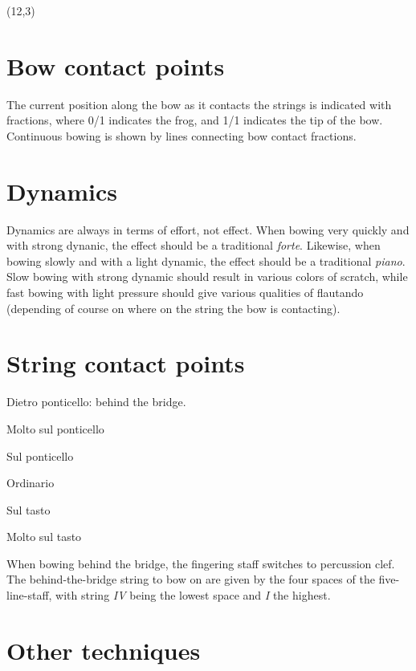 \documentclass[10pt]{article}
\begin{document}
\begin{textblock}{11}(12,3)

\section{Bow contact points}

The current position along the bow as it contacts the strings is indicated
with fractions, where 0/1 indicates the frog, and 1/1 indicates the tip of
the bow. Continuous bowing is shown by lines connecting bow contact
fractions.

\section{Dynamics}

Dynamics are always in terms of effort, not effect. When bowing very
quickly and with strong dynanic, the effect should be a traditional
\emph{forte}. Likewise, when bowing slowly and with a light dynamic, the
effect should be a traditional \emph{piano}. Slow bowing with strong
dynamic should result in various colors of scratch, while fast bowing with
light pressure should give various qualities of flautando (depending of
course on where on the string the bow is contacting).

\section{String contact points}

\begin{description}[style=nextline]
    \item[D.P.]
        Dietro ponticello: behind the bridge.
    \item[M.S.P.]
        Molto sul ponticello
    \item[S.P.]
        Sul ponticello
    \item[Ord.]
        Ordinario
    \item[S.T.]
        Sul tasto
    \item[M.S.T.]
        Molto sul tasto
\end{description}

When bowing behind the bridge, the fingering staff switches to percussion
clef. The behind-the-bridge string to bow on are given by the four spaces
of the five-line-staff, with string \emph{IV} being the lowest space and
\emph{I} the highest.

\section{Other techniques}


\end{textblock}
\end{document}
